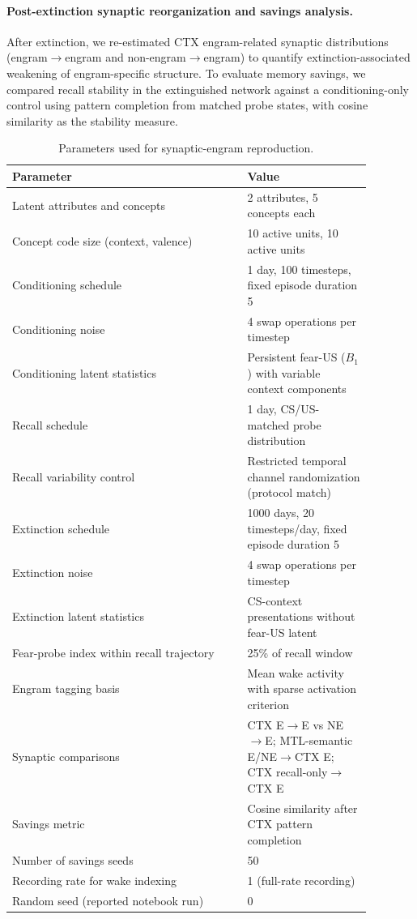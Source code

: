 \documentclass{article}
\begin{document}
\paragraph{Post-extinction synaptic reorganization and savings analysis.}
After extinction, we re-estimated CTX engram-related synaptic distributions (engram$\rightarrow$engram and non-engram$\rightarrow$engram) to quantify extinction-associated weakening of engram-specific structure. To evaluate memory savings, we compared recall stability in the extinguished network against a conditioning-only control using pattern completion from matched probe states, with cosine similarity as the stability measure.

\begin{table}[ht]
\centering
\caption{Parameters used for synaptic-engram reproduction.}
\label{tab:synaptic_engrams_parameters}
\begin{tabular}{p{0.58\linewidth}p{0.30\linewidth}}
\toprule
\textbf{Parameter} & \textbf{Value} \\
\midrule
Latent attributes and concepts & 2 attributes, 5 concepts each \\
Concept code size (context, valence) & 10 active units, 10 active units \\
Conditioning schedule & 1 day, 100 timesteps, fixed episode duration 5 \\
Conditioning noise & 4 swap operations per timestep \\
Conditioning latent statistics & Persistent fear-US ($B_1$) with variable context components \\
Recall schedule & 1 day, CS/US-matched probe distribution \\
Recall variability control & Restricted temporal channel randomization (protocol match) \\
Extinction schedule & 1000 days, 20 timesteps/day, fixed episode duration 5 \\
Extinction noise & 4 swap operations per timestep \\
Extinction latent statistics & CS-context presentations without fear-US latent \\
Fear-probe index within recall trajectory & 25\% of recall window \\
Engram tagging basis & Mean wake activity with sparse activation criterion \\
Synaptic comparisons & CTX E$\rightarrow$E vs NE$\rightarrow$E; MTL-semantic E/NE$\rightarrow$CTX E; CTX recall-only$\rightarrow$CTX E \\
Savings metric & Cosine similarity after CTX pattern completion \\
Number of savings seeds & 50 \\
Recording rate for wake indexing & 1 (full-rate recording) \\
Random seed (reported notebook run) & 0 \\
\bottomrule
\end{tabular}
\end{table}
\end{document}
